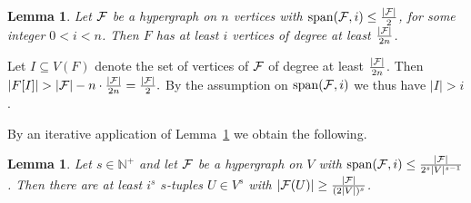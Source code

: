 \documentclass[11pt]{article}
\makeatletter
\renewenvironment{proof}[1][\proofname]
{\par\pushQED{\qed}
	\normalfont\topsep6\p@\@plus6\p@\relax\trivlist
	\item[\hskip\labelsep\bfseries#1\@addpunct{.}]
	\ignorespaces}
{\popQED\endtrivlist\@endpefalse}
\newtheorem{lemma}[theo]{Lemma}
\newcommand{\FF}{{\cal F}}
\renewcommand{\wp}{\mathrm{span}}
\renewcommand{\a}{\alpha}
\newcommand{\sub}{\subseteq}
\newcommand{\N}{\mathbb{N}}
\DeclareMathOperator{\trace}{Tr}
\makeatother
\begin{document}





\begin {lemma}
\label{lelink}
Let $\FF$ be a hypergraph on $n$ vertices with $\wp(\FF,i) \le \frac{|\FF|}{2}$, for some integer $0<i<n$.
Then $F$ has at least $i$ vertices of degree at least $\frac{|\FF|}{2n}$. 
%
%
%
\end {lemma}


\begin{proof}
	Let $I \sub V(F)$ denote the set of vertices of $\FF$ of degree at least $\frac{|\FF|}{2n}$.
	Then
	$|F[I]| > |\FF|-n \cdot \frac{|\FF|}{2n} =
	\frac{|\FF|}{2}.$
	By the assumption on $\wp(\FF,i)$ we thus have $|I| > i$.
\end{proof}

By an iterative application of Lemma~\ref{lelink} we obtain the following. %
\begin {lemma}
\label{lelinkcor}
Let $s \in \N^+$ and let $\FF$ be a hypergraph on $V$ with 
$\wp(\FF,i) \le \frac{|\FF|}{2^{s} |V|^{s-1}}$. %
Then there are at least $i^s$ $s$-tuples $U \in V^s$ with $|\FF(U)| \ge \frac{|\FF|}{(2|V|)^s}$.
\end{lemma}
\end{document}
